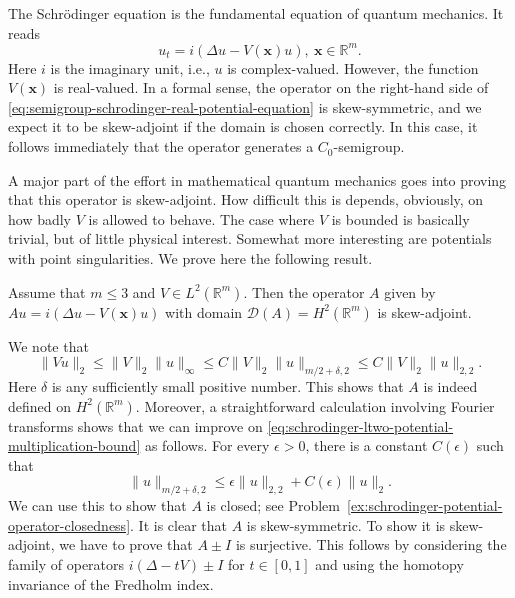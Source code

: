 The Schrödinger equation is the fundamental equation of quantum mechanics. It reads
\begin{equation}\label{eq:semigroup-schrodinger-real-potential-equation}
u_t=i(\Delta u-V(\bm{x})u),\ \bm{x}\in\mathbb{R}^m.
\end{equation}
Here $i$ is the imaginary unit, i.e., $u$ is complex-valued. However, the function $V(\bm{x})$ is real-valued. In a formal sense, the operator on the right-hand side of \eqref{eq:semigroup-schrodinger-real-potential-equation} is skew-symmetric, and we expect it to be skew-adjoint if the domain is chosen correctly. In this case, it follows immediately that the operator generates a $C_0$-semigroup.\par A major part of the effort in mathematical quantum mechanics goes into proving that this operator is skew-adjoint. How difficult this is depends, obviously, on how badly $V$ is allowed to behave. The case where $V$ is bounded is basically trivial, but of little physical interest. Somewhat more interesting are potentials with point singularities. We prove here the following result.

\begin{Theorem}
\label{thm:schrodinger-ltwo-potential-skew-adjointness}
Assume that $m\leq3$ and $V\in L^2(\mathbb{R}^m)$. Then the operator $A$ given by $Au=i(\Delta u-V(\bm{x})u)$ with domain $\mathcal{D}(A)=H^2(\mathbb{R}^m)$ is skew-adjoint.
\end{Theorem}

\begin{Proof}
We note that
\begin{equation}\label{eq:schrodinger-ltwo-potential-multiplication-bound}
\|Vu\|_2\leq\|V\|_2\|u\|_\infty\leq C\|V\|_2\|u\|_{m/2+\delta,2}\leq C\|V\|_2\|u\|_{2,2}.
\end{equation}
Here $\delta$ is any sufficiently small positive number. This shows that $A$ is indeed defined on $H^2(\mathbb{R}^m)$. Moreover, a straightforward calculation involving Fourier transforms shows that we can improve on \eqref{eq:schrodinger-ltwo-potential-multiplication-bound} as follows. For every $\epsilon>0$, there is a constant $C(\epsilon)$ such that
\begin{equation}\label{eq:schrodinger-potential-small-relative-interpolation-bound}
\|u\|_{m/2+\delta,2}\leq\epsilon\|u\|_{2,2}+C(\epsilon)\|u\|_2.
\end{equation}
We can use this to show that $A$ is closed; see Problem~\ref{ex:schrodinger-potential-operator-closedness}. It is clear that $A$ is skew-symmetric. To show it is skew-adjoint, we have to prove that $A\pm I$ is surjective. This follows by considering the family of operators $i(\Delta-tV)\pm I$ for $t\in[0,1]$ and using the homotopy invariance of the Fredholm index.
\end{Proof}

